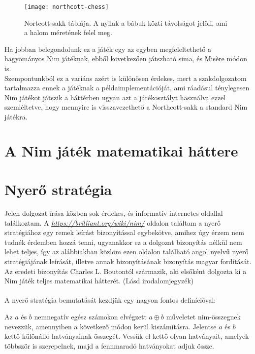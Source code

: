 \begin{figure}[h]
	\texttt{[image: northcott-chess]}
	\centering
	\caption{Nortcott-sakk táblája. A nyilak a bábuk közti távolságot jelöli, ami a halom méretének felel meg.}
\end{figure}

Ha jobban belegondolunk ez a játék egy az egyben megfeleltethető a hagyományos Nim játéknak, ebből következően játszható sima, és Misère módon is.\\ 
Szempontunkból ez a variáns azért is különösen érdekes, mert a szakdolgozatom tartalmazza ennek a játéknak a példaimplementációját, ami ráadásul ténylegesen Nim játékot játszik a háttérben ugyan azt a játékosztályt használva ezzel szemléltetve, hogy mennyire is visszavezethető a Northcott-sakk a standard Nim játékra.

\section{A Nim játék matematikai háttere}


\section{Nyerő stratégia}
Jelen dolgozat írása közben sok érdekes, és informatív internetes oldallal találkoztam. A {\em \url{ https://brilliant.org/wiki/nim/}} oldalon találtam a nyerő stratégiához egy remek leírást bizonyítással egybekötve, amihez úgy érzem nem tudnék érdemben hozzá tenni, ugyanakkor ez a dolgozat bizonyítás nélkül nem lehet teljes, így az alábbiakban közlöm ezen oldalon található angol nyelvű nyerő stratégiájának leírását, illetve annak bizonyításának bizonyítás magyar fordítását. Az eredeti bizonyítás Charles L. Boutontól származik, aki elsőként dolgozta ki a Nim játék teljes matematikai hátterét. (Lásd irodalomjegyzék) \\ \\

A nyerő stratégia bemutatását kezdjük egy nagyon fontos definícióval:
\begin{definition}
	Az $a$ és $b$ nemnegatív egész számokon elvégzett $a \oplus b$ műveletet nim-összegnek nevezzük, amennyiben a következő módon kerül kiszámításra. Jelentse $a$ és $b$ kettő különálló hatványainak összegét. Vessük el kettő olyan hatványait, amelyek többször is szerepelnek, majd a fennmaradó hatványokat adjuk össze.
\end{definition}

